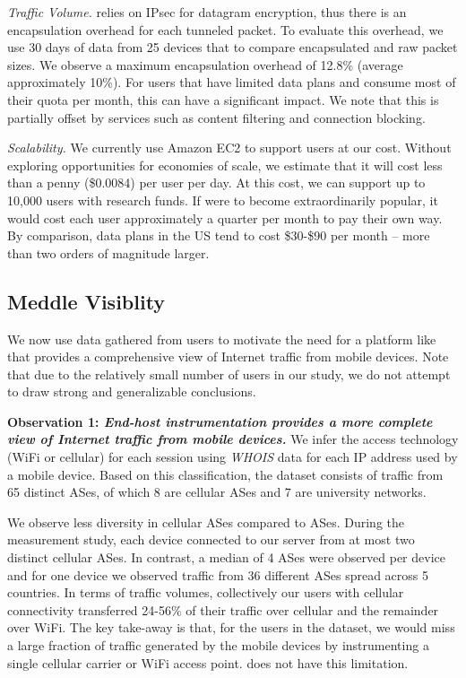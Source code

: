 \noindent\emph{Traffic Volume.}
\meddle relies on IPsec for datagram encryption, thus there is an encapsulation overhead for each tunneled packet. 
To evaluate this overhead, we use 30 days of data from 25 devices that to compare encapsulated and raw packet sizes. 
We observe a maximum encapsulation overhead of 12.8\% (average approximately 10\%). 
For users that have limited data plans and consume most of their quota per month, this can have 
a significant impact. We note that this is partially offset by \meddle services such as content filtering and 
connection blocking. %

\noindent\emph{Scalability.} We currently use Amazon EC2 to support users at our cost. 
Without exploring opportunities for economies of scale, we estimate that 
it will cost less than a penny (\$0.0084) per user per day. At this cost, we can support up to 
10,000 users with research funds. If \meddle were to become extraordinarily popular, it would 
cost each user approximately a quarter per month to pay their own way. By comparison, 
data plans in the US tend to cost \$30-\$90 per month -- more than two orders of magnitude larger.

\subsection{Meddle Visiblity}

We now use data gathered from users to motivate the need for a platform like \meddle that provides a comprehensive view of Internet traffic from mobile devices. 
Note that due to the relatively small number of users in our study, we do not attempt to  
draw strong and generalizable conclusions. 

\noindent\textbf{Observation 1: \emph{End-host instrumentation provides a more complete view of 
Internet traffic from mobile devices.}} We infer the access technology (WiFi or cellular) for 
each session using \emph{WHOIS} data for each IP address used by a mobile device.
Based on this classification, the \mobWild dataset consists of traffic from 65 distinct ASes, of which 8 are cellular ASes and 7 are university networks.

We observe less diversity in cellular ASes compared to \wifi ASes.
During the measurement study, each device connected to our \platname server from at most two distinct cellular ASes. 
In contrast, a median of 4 \wifi ASes were observed per device and for one device we observed traffic from 36 different \wifi ASes spread across 5 countries.
In terms of traffic volumes, collectively our users with cellular connectivity transferred 24-56\% of their traffic over cellular and the remainder over WiFi. 
The key take-away is that, for the users in the \mobWild dataset, we would miss a large fraction of traffic generated by the mobile devices by instrumenting a single cellular carrier or WiFi access point. 
\meddle does not have this limitation.

